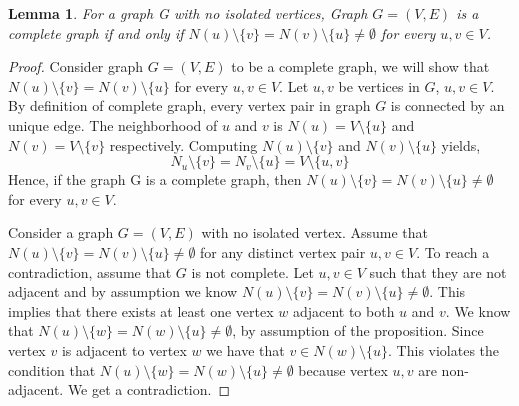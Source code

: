 \documentclass{article}
\newtheorem{lemma}[theorem]{Lemma}
\begin{document}
 \begin{lemma}
\label{lemma:complete_graph_iff_neighbor_set_condition}
   For a graph G with no isolated vertices, Graph $G = (V, E)$ is a complete graph if and only if $N(u) \setminus \{v\} = N(v)\setminus \{u\} \neq \emptyset$ for every $u,v \in V$.
\end{lemma}
\begin{proof} 
Consider graph $G = (V, E)$ to be a complete graph, we will show that $N(u) \setminus \{v\} = N(v)\setminus \{u\}$ for every $u,v \in V$. Let $u, v$ be vertices in $G$, $u, v \in V$. By definition of complete graph, every vertex pair in graph $G$ is connected by an unique edge. The neighborhood of $u$ and $v$ is $N(u) = V \setminus \{u\}$ and $N(v) = V \setminus \{v\}$ respectively. Computing $N(u) \setminus \{v\}$ and $N(v) \setminus \{u\}$ yields, 
\begin{equation}
N_u \setminus \{v\} = N_v \setminus \{u\} = V \setminus \{u, v\}    
\end{equation}
Hence, if the graph G is a complete graph, then $N(u) \setminus \{v\} = N(v)\setminus \{u \} \neq \emptyset$ for every $u,v \in V$.

Consider a graph $ G = (V, E) $ with no isolated vertex. Assume that $ N(u) \setminus \{v\} = N(v) \setminus \{u\} \neq \emptyset $ for any distinct vertex pair $ u, v \in V $. To reach a contradiction, assume that $G$ is not complete. Let $u, v \in V$ such that they are not adjacent and by assumption we know $N(u) \setminus \{v\} = N(v)\setminus \{u\} \neq \emptyset$. This implies that there exists at least one vertex $w$ adjacent to both $u$ and $v$. We know that $N(u) \setminus \{w\} = N(w)\setminus \{u\} \neq \emptyset$, by assumption of the proposition. Since vertex $v$ is adjacent to vertex $w$ we have that $v \in  N(w)\setminus \{u\}$. This violates the condition that $N(u) \setminus \{w\} = N(w)\setminus \{u\} \neq \emptyset$ because vertex $u, v$ are non-adjacent. We get a contradiction.
\end{proof}
\end{document}

